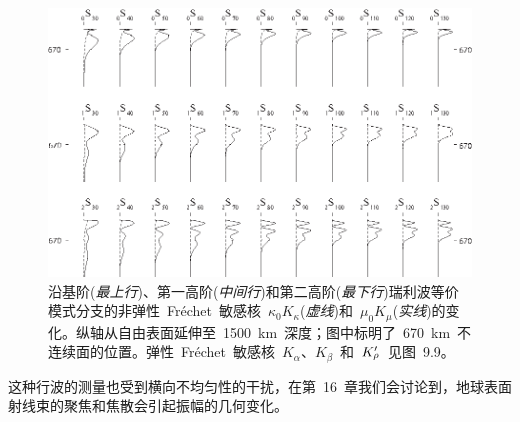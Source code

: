 \begin{figure}[!t]
\begin{center}
\includegraphics{../figures/chap09/fig15.eps}
\end{center}
\caption[Qkernels4]{\label{9.fig.Qkern4}
沿基阶({\em 最上行\/})、第一高阶({\em 中间行\/})和第二高阶({\em 最下行\/})瑞利波等价模式分支的非弹性~Fr\'{e}chet~敏感核~$\kappa_0K_{\kappa}$({\em 虚线\/})和~$\mu_0K_{\mu}$({\em 实线\/})的变化。纵轴从自由表面延伸至~1500~km~深度；图中标明了~670~km~不连续面的位置。弹性~Fr\'{e}chet~敏感核~$K_{\alpha}$、$K_{\beta}$~和~$K_{\raisebox{0.3 ex}{\scriptsize$\rho$}}^{\prime}$~见图~9.9。
}
\end{figure}
这种行波的测量也受到横向不均匀性的干扰，在第~16~章我们会讨论到，地球表面射线束的聚焦和焦散会引起振幅的几何变化。

